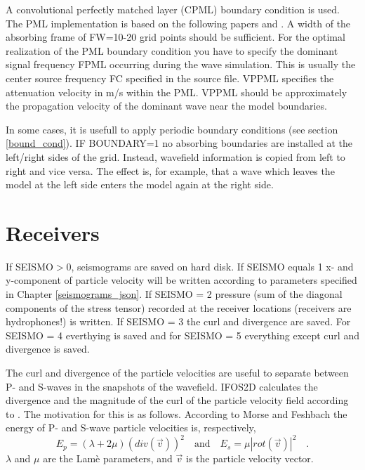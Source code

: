A convolutional perfectly matched layer (CPML) boundary condition is used. The PML implementation is based on the following papers \cite{komatitsch:07} and \cite{martin:09}. A width of the absorbing frame of FW=10-20 grid points should be sufficient. For the optimal realization of the PML boundary condition you have to specify the dominant signal frequency FPML occurring during the wave simulation. This is usually the center source frequency FC specified in the source file. VPPML specifies the attenuation velocity in m/s within the PML. VPPML should be approximately the propagation velocity of the dominant wave near the model boundaries.

In some cases, it is usefull to apply periodic boundary conditions (see section \ref{bound_cond}). IF BOUNDARY=1 no absorbing boundaries are installed at the left/right sides of the grid. Instead, wavefield information is copied from left to right and vice versa. The effect is, for example, that a wave which leaves the model at the left side enters the model again at the right side.


\section{Receivers}
{\color{blue}{\begin{verbatim}
"Receiver" : "comment",
			"SEISMO" : "1",
			"READREC" : "1",
			"REC_FILE" : "./receiver/receiver.dat",
			"REFRECX, REFRECY" : "0.0 , 0.0",
			"XREC1, YREC1" : "6.0 , 0.2",
			"XREC2, YREC2" : "93.0 , 0.2",
			"NGEOPH" : "80",

\end{verbatim}}}

If SEISMO$>$0, seismograms are saved on hard disk. If SEISMO equals 1 x- and y-component of particle velocity will be written according to parameters specified in Chapter \ref{seismograms_json}.
If SEISMO = 2 pressure (sum of the diagonal components of the stress tensor) recorded at the receiver locations (receivers are hydrophones!) is written. If SEISMO = 3 the curl and divergence are saved. For SEISMO = 4 everthying is saved and for SEISMO = 5 everything except curl and divergence is saved.

The curl and divergence of the particle velocities are useful to separate between P- and S-waves in the snapshots of the wavefield. IFOS2D calculates the divergence and the magnitude of the curl of the particle velocity field according to \cite{dougherty:88}. The motivation for this is as follows. According to Morse and Feshbach \cite{morse:53} the energy of P- and S-wave particle velocities is, respectively,
\begin{equation}
E_p=\left(\lambda + 2 \mu\right) (div(\vec{v}))^2 \quad \mbox{and} \quad E_s=\mu \left|rot(\vec{v})\right|^2 \quad\mbox{.}
\label{eq_E}
\end{equation}
$\lambda$ and $\mu$ are the Lam\`{e} parameters, and $\vec{v}$ is the particle velocity vector.

